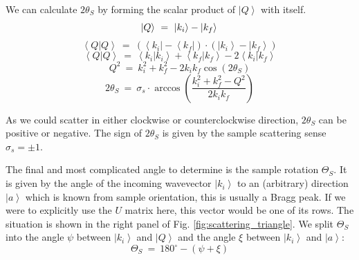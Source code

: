 We can calculate $2 \theta_S$ by forming the scalar product of $\left| Q \right>$ with itself.
\begin{equation} 
	\left| Q \right> \ =\  \left| k_i \right> - \left| k_f \right> \\ 
\end{equation}
\begin{equation} 
	\left< Q | Q \right> \ =\  \left( \left< k_i \right| - \left< k_f \right| \right) \cdot \left( \left| k_i \right> - \left| k_f \right> \right)
\end{equation}
\begin{equation} 
	\left< Q | Q \right> \ =\  \left< k_i | k_i \right> + \left< k_f | k_f \right> - 2 \left< k_i | k_f \right> 
\end{equation}
\begin{equation} 
	Q^2 \ =\  k_i^2 + k_f^2 - 2 k_i k_f \cos \left( 2 \theta_S \right) 
\end{equation}
\begin{equation}
	\boxed{ 2 \theta_S \ =\  \sigma_s \cdot \arccos \left( \frac{k_i^2 + k_f^2 - Q^2}{2 k_i k_f} \right) } 
\end{equation}

As we could scatter in either clockwise or counterclockwise direction, $2 \theta_S$ can be positive or negative.
The sign of $2 \theta_S$ is given by the sample scattering sense $\sigma_s = \pm 1$.


\vspace{0.5cm}


The final and most complicated angle to determine is the sample rotation $\Theta_S$.
It is given by the angle of the incoming wavevector $\left| k_i \right>$ to an (arbitrary) direction $\left| a \right>$ which is known from sample orientation, this is usually a Bragg peak. If we were to explicitly use the $U$ matrix here, this vector would be one of its rows.
The situation is shown in the right panel of Fig. \ref{fig:scattering_triangle}.
We split $\Theta_S$ into the angle $\psi$ between $\left| k_i \right>$ and $\left| Q \right>$ and the angle $\xi$ between $\left| k_i \right>$ and $\left| a \right>$:
\begin{equation} \boxed{ \Theta_S \ =\  180^{\circ} - \left( \psi + \xi \right) } \end{equation}


\vspace{0.5cm}


